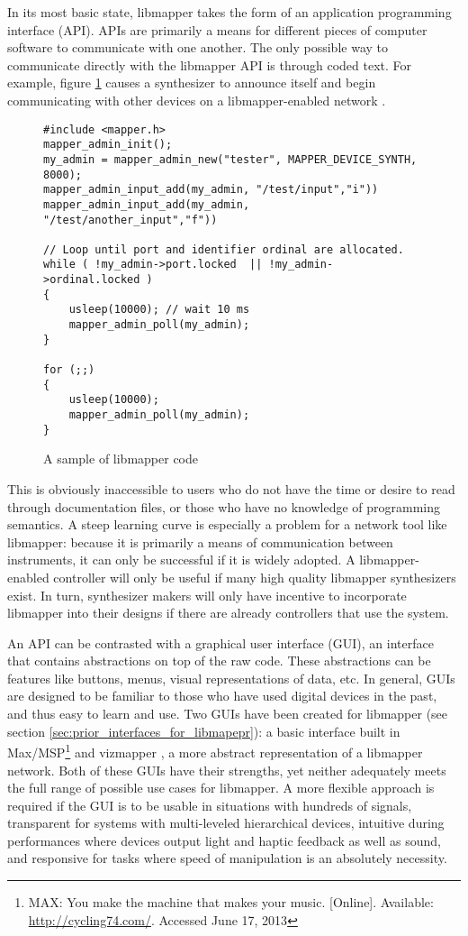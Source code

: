 In its most basic state, libmapper takes the form of an application programming interface (API). APIs are primarily a means for different pieces of computer software to communicate with one another. The only possible way to communicate directly with the libmapper API is through coded text. For example, figure \ref{fig:libmapper_code} causes a synthesizer to announce itself and begin communicating with other devices on a libmapper-enabled network .

\begin{figure}[ht!]
\begin{lstlisting}[]
#include <mapper.h>
mapper_admin_init();
my_admin = mapper_admin_new("tester", MAPPER_DEVICE_SYNTH, 8000); 
mapper_admin_input_add(my_admin, "/test/input","i")) 
mapper_admin_input_add(my_admin, "/test/another_input","f"))

// Loop until port and identifier ordinal are allocated. 
while ( !my_admin->port.locked	|| !my_admin->ordinal.locked )
{
	usleep(10000); // wait 10 ms 
	mapper_admin_poll(my_admin);
}

for (;;) 
{
	usleep(10000);
	mapper_admin_poll(my_admin); 
}
\end{lstlisting}
\caption{A sample of libmapper code}
\label{fig:libmapper_code}
\end{figure}

This is obviously inaccessible to users who do not have the time or desire to read through documentation files, or those who have no knowledge of programming semantics. A steep learning curve is especially a problem for a network tool like libmapper: because it is primarily a means of communication between instruments, it can only be successful if it is widely adopted. A libmapper-enabled controller will only be useful if many high quality libmapper synthesizers exist. In turn, synthesizer makers will only have incentive to incorporate libmapper into their designs if there are already controllers that use the system. 

An API can be contrasted with a graphical user interface (GUI), an interface that contains abstractions on top of the raw code. These abstractions can be features like buttons, menus, visual representations of data, etc. In general, GUIs are designed to be familiar to those who have used digital devices in the past, and thus easy to learn and use. Two GUIs have been created for libmapper (see section \ref{sec:prior_interfaces_for_libmapepr}): a basic interface built in Max/MSP\footnote{MAX: You make the machine that makes your music. [Online]. Available: \url{http://cycling74.com/}. Accessed June 17, 2013} and vizmapper \cite{vizmapper}, a more abstract representation of a libmapper network. Both of these GUIs have their strengths, yet neither adequately meets the full range of possible use cases for libmapper. A more flexible approach is required if the GUI is to be usable in situations with hundreds of signals, transparent for systems with multi-leveled hierarchical devices, intuitive during performances where devices output light and haptic feedback as well as sound, and responsive for tasks where speed of manipulation is an absolutely necessity. 

